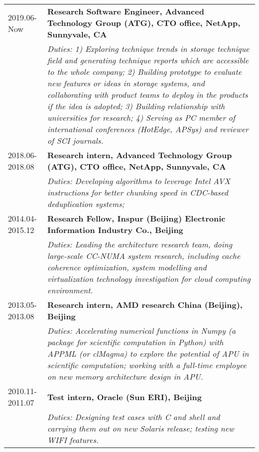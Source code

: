 \documentclass{article}
\begin{document}
    \begin{tabular}{lp{15cm}}
         2019.06-Now & \bf{Research Software Engineer, Advanced Technology Group (ATG), CTO office, NetApp, Sunnyvale, CA} \\
         & \small{\it Duties: 1) Exploring technique trends in storage technique field and generating technique reports which are accessible to the whole company; 
         2) Building prototype to evaluate new features or ideas in storage systems, and collaborating with product teams to deploy in the products if the idea is adopted;
         3) Building relationship with universities for research; 4) Serving as PC member of international conferences (HotEdge, APSys) and reviewer of SCI journals. }\\
         2018.06-2018.08 & \bf{Research intern, Advanced Technology Group (ATG), CTO office, NetApp, Sunnyvale, CA}\\
         & \small{\it Duties: Developing algorithms to leverage Intel AVX instructions for better chunking speed in CDC-based deduplication systems;}\\
         2014.04-2015.12 &\bf{Research Fellow,  Inspur (Beijing) Electronic Information Industry Co., Beijing}\\
         & \small{\it Duties: Leading the architecture research team, doing large-scale CC-NUMA system research, including cache coherence optimization, system modelling and virtualization technology investigation for cloud computing environment. }\\
         2013.05-2013.08 & \bf {Research intern, AMD research China (Beijing), Beijing}\\
         &\small{\it Duties: Accelerating numerical functions in Numpy (a package for scientific computation in Python) with APPML (or clMagma) to explore the potential of APU in scientific computation; working with a full-time employee on new memory architecture design in APU.}\\
         2010.11-2011.07 & \bf{Test intern, Oracle (Sun ERI), Beijing} \\
         &\small{\it Duties: Designing test cases with C and shell and carrying them out on new Solaris release; testing new WIFI features.}
    \end{tabular}
\end{document}
